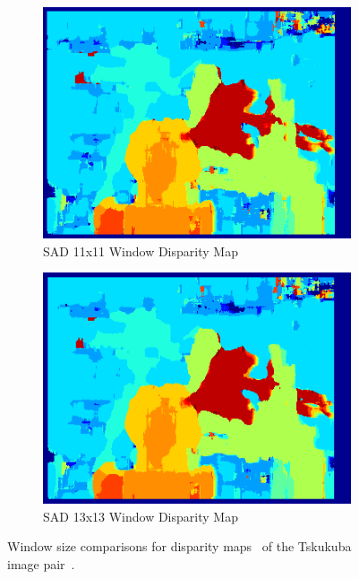 \begin{figure}
\begin{center}
\begin{subfigure}{0.45\textwidth}
		\includegraphics[width=\textwidth]{figures/sad_tsukuba_11x11_0-15.png}
		\caption{SAD 11x11 Window Disparity Map}
		\label{fig:tsukuba11x11}
	\end{subfigure}
	\begin{subfigure}{0.45\textwidth}
		\includegraphics[width=\textwidth]{figures/sad_tsukuba_13x13_0-15.png}
		\caption{SAD 13x13 Window Disparity Map}
		\label{fig:tsukuba13x13}
	\end{subfigure}
	\captionfonts
	\caption{Window size comparisons for disparity maps~\cite{matlab} of the Tskukuba image pair~\cite{middlebury}.}
	\label{fig:tsukubaWinSize}
\end{center}
\end{figure}


